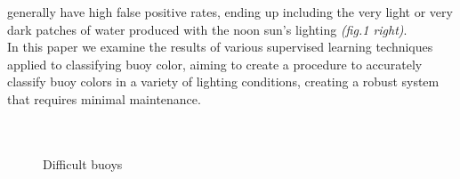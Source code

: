 \documentclass{article} %
\begin{document}
generally have high false positive rates, ending up including the very light or very dark patches of water produced with the 
noon sun's lighting \textit{(fig.1 right)}.
\\In this paper we examine the results of various supervised learning techniques applied to classifying buoy color, aiming to 
create a procedure to accurately classify buoy colors in a variety of lighting conditions, creating a robust system that requires 
minimal maintenance.
\\
\\
\\
\begin{figure}[h]
\begin{center}
\end{center}
\caption{Difficult buoys}
\end{figure}
\end{document}
